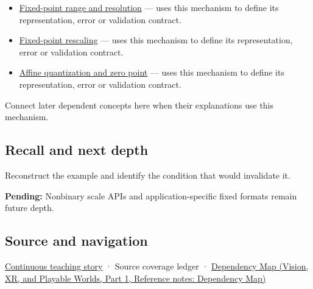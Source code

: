 \begin{itemize}
\tightlist
\item
  \hyperref[appendix-ceb4c4a9b5a1]{Fixed-point range and resolution} --- uses this mechanism to define its representation, error or validation contract.
\item
  \hyperref[appendix-3333db47830f]{Fixed-point rescaling} --- uses this mechanism to define its representation, error or validation contract.
\item
  \hyperref[appendix-d5da3eaabaef]{Affine quantization and zero point} --- uses this mechanism to define its representation, error or validation contract.
\end{itemize}

Connect later dependent concepts here when their explanations use this mechanism.

\subsection{Recall and next depth}\label{appendix-1d0dbe8924cc-recall-and-next-depth}

\hypertarget{appendix-1d0dbe8924cc-recall-and-next-depth}{}

Reconstruct the example and identify the condition that would invalidate it.

\textbf{Pending:} Nonbinary scale APIs and application-specific fixed formats remain future depth.

\subsection{Source and navigation}\label{appendix-1d0dbe8924cc-source-and-navigation}

\hypertarget{appendix-1d0dbe8924cc-source-and-navigation}{}

\hyperref[01-foundations-i-ch001-choosing-what-information-to-keep]{Continuous teaching story} · {Source coverage ledger} · \href{../07-Vision-XR-and-Playable-Worlds-P01/main.pdf\#appendix-4ad47bdd269a}{Dependency Map (Vision, XR, and Playable Worlds, Part 1, Reference notes: Dependency Map)}
